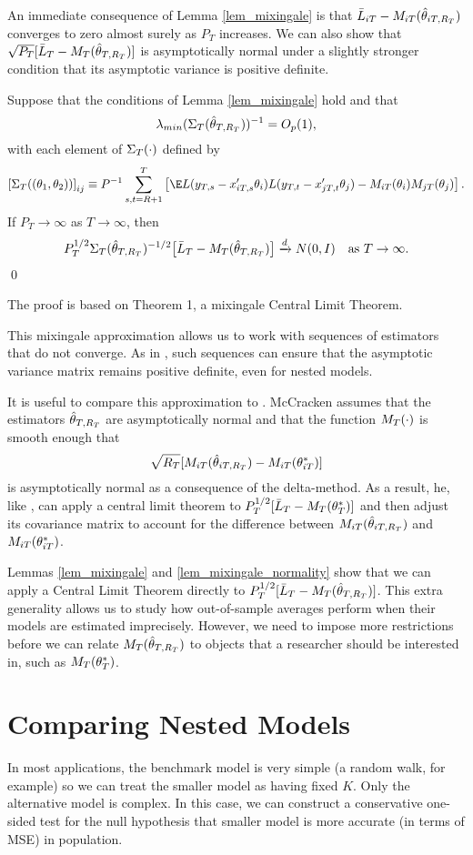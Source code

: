 \documentclass[11pt]{article} \def\baselinestretch{1.08}
\begin{document}
An immediate consequence of Lemma \ref{lem_mixingale} is that $\bar L_{{i}T} -
M_{{i}T}({\hat \theta_{{i}T,{R_T}}})$ converges to zero almost surely as $P_T$ increases.  We can
also show that $\sqrt{P_T} [\bar L_{{}T} - M_{{}T}({\hat \theta_{{}T,{R_T}}})]$ is asymptotically
normal under a slightly stronger condition that its asymptotic
variance is positive definite.
\begin{lem} \label{lem_mixingale_normality}
  Suppose that the conditions of Lemma \ref{lem_mixingale} hold and that
  \[
  \lambda_{min}(\Sigma_T({\hat \theta_{{}T,{R_T}}}))^{-1} = O_p(1),
  \] 
  with each element of $\Sigma_T({\cdot})$ defined by
  \[\left[\ST{(\theta_1,\theta_2)}\right]_{ij} \equiv P^{-1} \sum_{s,t=R+1}^T 
  \left[ \E L(\yT{s}-\xT{i}{s}'\theta_i) L(\yT{t}-\xT{j}{t}'\theta_j)
  - \mmT{i}{\theta_i} \mmT{j}{\theta_j}\right].
  \]
  If $P_T \to \infty$ as $T \to \infty$, then
  \begin{equation}
    P_T^{1/2} \Sigma_T({\hat \theta_{{}T,{R_T}}})^{-1/2} \big[\bar L_{{}T}  - M_{{}T}({\hat \theta_{{}T,{R_T}}})\big] \xrightarrow{d}
    N(0,I) \quad \text{as $T \to \infty$}. 
\end{equation}
\qed
\end{lem}
The proof is based on  Theorem 1,
a mixingale Central Limit Theorem.

This mixingale approximation allows us to work with sequences of
estimators that do not converge.  As in
, such sequences can ensure that the
asymptotic variance matrix remains positive definite, even for nested
models. 

It is useful to compare this approximation to
. McCracken assumes that the
estimators $\hat \theta_{{}T,{R_T}}$ are asymptotically normal and that the
function $M_{{}T}({\cdot})$ is smooth enough that
\[
\sqrt{R_T} [M_{{i}T}({\hat \theta_{{i}T,{R_T}}}) - M_{{i}T}({\theta^*_{{i}T}})]
\]
is asymptotically normal as a consequence of the delta-method.  As a
result, he, like , can apply a
central limit theorem to $P_T^{1/2} [\bar L_{{}T} - M_{{}T}({\theta^*_{{}T}})]$
and then adjust its covariance matrix to account for the difference
between $M_{{i}T}({\hat \theta_{{i}T,{R_T}}})$ and $M_{{i}T}({\theta^*_{{i}T}})$.

Lemmas \ref{lem_mixingale} and \ref{lem_mixingale_normality} show that
we can apply a Central Limit Theorem directly to $P_T^{1/2} [\bar L_{{}T} -
M_{{}T}({\hat \theta_{{}T,{R_T}}})]$.  This extra generality allows us to study how out-of-sample
averages perform when their models are estimated imprecisely.
However, we need to impose more restrictions before we can relate
$M_{{}T}({\hat \theta_{{}T,{R_T}}})$ to objects that a researcher should be interested in, such
as $M_{{}T}({\theta^*_{{}T}})$.
\section{Comparing Nested Models} \label{sec_nested}  
In most applications, the benchmark model is very simple (a random walk,
for example) so we can treat the smaller model as having fixed $K$.
Only the alternative model is complex.
In this case, we can construct a conservative one-sided test for the
null hypothesis that smaller model is more accurate (in terms of MSE)
in population. 
\end{document}
